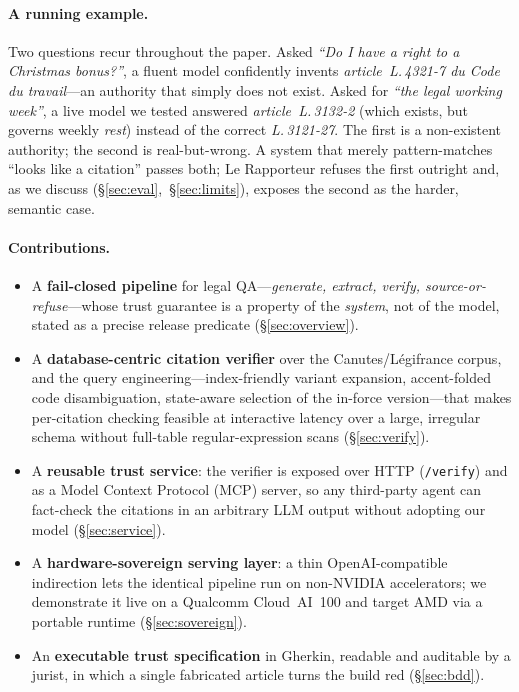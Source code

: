 \paragraph{A running example.}
Two questions recur throughout the paper. Asked \emph{``Do I have a right to a
Christmas bonus?''}, a fluent model confidently invents
\emph{article~L.\,4321-7 du Code du travail}---an authority that simply does
not exist. Asked for \emph{``the legal working week''}, a live model we tested
answered \emph{article~L.\,3132-2} (which exists, but governs weekly
\emph{rest}) instead of the correct \emph{L.\,3121-27}. The first is a
non-existent authority; the second is real-but-wrong. A system that merely
pattern-matches ``looks like a citation'' passes both; Le Rapporteur refuses
the first outright and, as we discuss (\S\ref{sec:eval},~\S\ref{sec:limits}),
exposes the second as the harder, semantic case.

\paragraph{Contributions.}
\begin{itemize}
  \item A \textbf{fail-closed pipeline} for legal QA---\emph{generate,
  extract, verify, source-or-refuse}---whose trust guarantee is a property of
  the \emph{system}, not of the model, stated as a precise release predicate
  (\S\ref{sec:overview}).
  \item A \textbf{database-centric citation verifier} over the
  Canutes/Légifrance corpus, and the query engineering---index-friendly
  variant expansion, accent-folded code disambiguation, state-aware selection
  of the in-force version---that makes per-citation checking feasible at
  interactive latency over a large, irregular schema without full-table
  regular-expression scans (\S\ref{sec:verify}).
  \item A \textbf{reusable trust service}: the verifier is exposed over HTTP
  (\texttt{/verify}) and as a Model Context Protocol (MCP) server, so any
  third-party agent can fact-check the citations in an arbitrary LLM output
  without adopting our model (\S\ref{sec:service}).
  \item A \textbf{hardware-sovereign serving layer}: a thin OpenAI-compatible
  indirection lets the identical pipeline run on non-NVIDIA accelerators; we
  demonstrate it live on a Qualcomm Cloud~AI~100 and target AMD via a portable
  runtime (\S\ref{sec:sovereign}).
  \item An \textbf{executable trust specification} in Gherkin, readable and
  auditable by a jurist, in which a single fabricated article turns the build
  red (\S\ref{sec:bdd}).
\end{itemize}

